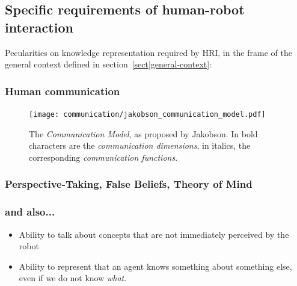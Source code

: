 \subsection{Specific requirements of human-robot interaction}
\label{sect|pecularities-krs-for-hri}

Pecularities on knowledge representation required by HRI, in the frame of the
general context defined in section~\ref{sect|general-context}:

\subsubsection{Human communication}

\begin{figure}%
\centering
  \texttt{[image: communication/jakobson\_communication\_model.pdf]}
  \caption{The \emph{Communication Model}, as proposed by Jakobson. In bold
  characters are the \emph{communication dimensions}, in italics, the
  corresponding \emph{communication functions}.}
  \label{fig|jakobson_communication_model}
\end{figure}

\subsubsection{Perspective-Taking, False Beliefs, Theory of Mind}


\subsubsection{and also...}

\begin{itemize}
	\item Ability to talk about concepts that are not immediately perceived by
	the robot


	\item {} Ability to
	represent that an agent knows something about something else, even if we do
	not know \emph{what}.

\end{itemize}


